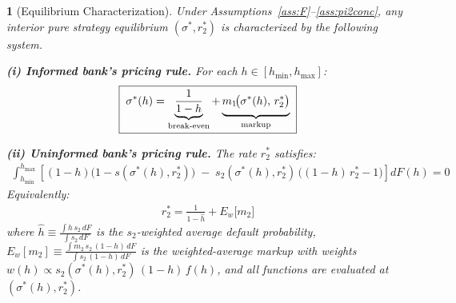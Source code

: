 \documentclass[12pt]{article}
\theoremstyle{plain}
\theoremstyle{plain}
\newtheorem{prop}[thm]{\protect\propositionname}
\theoremstyle{definition}  %
\theoremstyle{remark}  %
\providecommand{\propositionname}{Proposition}
\begin{document}
\begin{prop}[Equilibrium Characterization]\label{prop:char}
Under Assumptions~\ref{ass:F}--\ref{ass:pi2conc}, any interior pure strategy equilibrium $(\sigma^*, r_2^*)$ is characterized by the following system.

\medskip\noindent
\textbf{(i) Informed bank's pricing rule.} For each $h \in [h_{\min}, h_{\max}]$:
\begin{align}\label{eq:sigma}
    \boxed{\;\sigma^*(h) = \underbrace{\frac{1}{1-h}\vphantom{\Big|}}_{\text{break-even}} + \underbrace{m_1\!\big(\sigma^*(h),\, r_2^*\big)\vphantom{\Big|}}_{\text{markup}}\;}
\end{align}

\medskip\noindent
\textbf{(ii) Uninformed bank's pricing rule.} The rate $r_2^*$ satisfies:
\begin{align}\label{eq:r2foc}
    \int_{h_{\min}}^{h_{\max}} \left[(1-h)\big(1 - s(\sigma^*(h), r_2^*)\big) \;-\; s_2(\sigma^*(h), r_2^*)\, \big((1-h)\,r_2^* - 1\big)\right] dF(h) = 0
\end{align}
Equivalently:
\begin{align}\label{eq:r2star}
    \boxed{\;r_2^* = \frac{1}{1 - \hat{h}} + E_w\!\big[m_2\big]\;}
\end{align}
where $\hat{h} \equiv \frac{\int h\, s_2\, dF}{\int s_2\, dF}$ is the $s_2$-weighted average default probability, $E_w[m_2] \equiv \frac{\int m_2\, s_2\,(1-h)\, dF}{\int s_2\,(1-h)\, dF}$ is the weighted-average markup with weights $w(h) \propto s_2(\sigma^*(h), r_2^*)\,(1-h)\,f(h)$, and all functions are evaluated at $(\sigma^*(h), r_2^*)$.
\end{prop}
\end{document}
